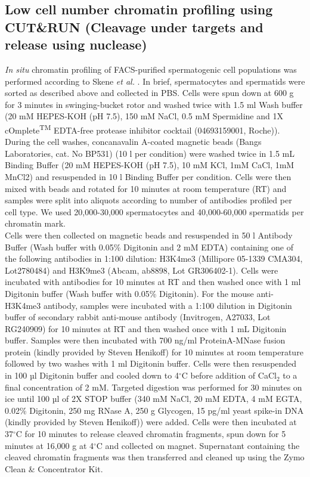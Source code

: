 \subsection{Low cell number chromatin profiling using CUT\&{}RUN (Cleavage under targets and release using nuclease)}
	\emph{In situ} chromatin profiling of FACS-purified spermatogenic cell populations was performed according to Skene \emph{et al.} \citep{Skene2018}. In brief, spermatocytes and spermatids were sorted as described above and collected in PBS. Cells were spun down at 600 g for 3 minutes in swinging-bucket rotor and washed twice with 1.5 ml Wash buffer (20 mM HEPES-KOH (pH 7.5), 150 mM NaCl, 0.5 mM Spermidine and 1X cOmplete\textsuperscript{TM} EDTA-free protease inhibitor cocktail (04693159001, Roche)). During the cell washes, concanavalin A-coated magnetic beads (Bangs Laboratories, cat. No BP531) (10 \textmu{}l per condition) were washed twice in 1.5 mL Binding Buffer (20 mM HEPES-KOH (pH 7.5), 10 mM KCl, 1mM CaCl, 1mM MnCl2) and resuspended in 10 \textmu{}l Binding Buffer per condition. Cells were then mixed with beads and rotated for 10 minutes at room temperature (RT) and samples were split into aliquots according to number of antibodies profiled per cell type. We used 20,000-30,000 spermatocytes and 40,000-60,000 spermatids per chromatin mark.\\ 
Cells were then collected on magnetic beads and resuspended in 50 \textmu{}l Antibody Buffer (Wash buffer with 0.05\% Digitonin and 2 mM EDTA) containing one of the following antibodies in 1:100 dilution: H3K4me3 (Millipore 05-1339 CMA304, Lot2780484) and H3K9me3 (Abcam, ab8898, Lot GR306402-1). Cells were incubated with antibodies for 10 minutes at RT and then washed once with 1 ml Digitonin buffer (Wash buffer with 0.05\% Digitonin). For the mouse anti-H3K4me3 antibody, samples were incubated with a 1:100 dilution in Digitonin buffer of secondary rabbit anti-mouse antibody (Invitrogen, A27033, Lot RG240909) for 10 minutes at RT and then washed once with 1 mL Digitonin buffer. Samples were then incubated with 700 ng/ml ProteinA-MNase fusion protein (kindly provided by Steven Henikoff) for 10 minutes at room temperature followed by two washes with 1 ml Digitonin buffer. Cells were then resuspended in 100 µl Digitonin buffer and cooled down to 4$^\circ$C before addition of CaCl$_2$ to a final concentration of 2 mM. Targeted digestion was performed for 30 minutes on ice until 100 µl of 2X STOP buffer (340 mM NaCl, 20 mM EDTA, 4 mM EGTA, 0.02\% Digitonin, 250 mg RNase A, 250 \textmu{}g Glycogen, 15 pg/ml yeast spike-in DNA (kindly provided by Steven Henikoff)) were added. Cells were then incubated at 37$^\circ$C for 10 minutes to release cleaved chromatin fragments, spun down for 5 minutes at 16,000 g at 4$^\circ$C and collected on magnet. Supernatant containing the cleaved chromatin fragments was then transferred and cleaned up using the Zymo Clean \& Concentrator Kit.
